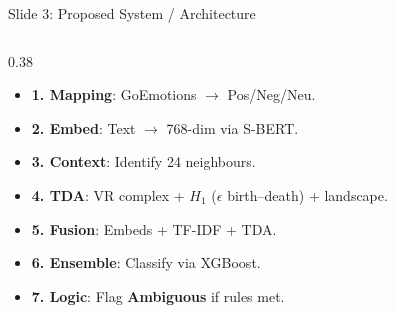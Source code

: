 \documentclass[aspectratio=169]{beamer}
\begin{document}
\begin{frame}[label=slide3]{Slide 3: Proposed System / Architecture}
\begin{columns}[T]
\begin{column}{0.38\textwidth}
\vspace{-0.1cm}
\begin{tcolorbox}[mybox,title=Steps Involved (Workflow),height=4.9cm]
\fontsize{7pt}{10.5pt}\selectfont
\begin{itemize}
    \item \textbf{1. Mapping}: GoEmotions $\to$ Pos/Neg/Neu.
    \item \textbf{2. Embed}: Text $\to$ 768-dim via S-BERT.
    \item \textbf{3. Context}: Identify 24 neighbours.
    \item \textbf{4. TDA}: VR complex + $H_1$ ($\epsilon$ birth--death) + landscape.
    \item \textbf{5. Fusion}: Embeds + TF-IDF + TDA.
    \item \textbf{6. Ensemble}: Classify via XGBoost.
    \item \textbf{7. Logic}: Flag \textbf{Ambiguous} if rules met.
\end{itemize}
\end{tcolorbox}
\end{column}
\end{columns}
\end{frame}
\end{document}
